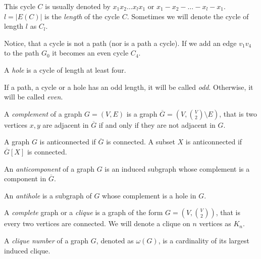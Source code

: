 This cycle $C$ is usually denoted by $x_1x_2\ldots x_lx_1$ or $x_1 - x_2 - \ldots - x_l - x_1$. $l = |E(C)|$ is the \emph{length} of the cycle $C$. Sometimes we will denote the cycle of length $l$ as $C_l$.

Notice, that a cycle is not a path (nor is a path a cycle). If we add an edge $v_1v_4$ to the path $G_0$ it becomes an even cycle $C_4$.

\begin{defn}[hole]
  A \emph{hole} is a cycle of length at least four.
\end{defn}

If a path, a cycle or a hole has an odd length, it will be called \emph{odd}. Otherwise, it will be called \emph{even}.

\begin{defn}[complement]
  A \emph{complement} of a graph $G = (V, E)$ is a graph $\overline{G} = (V, {V \choose 2} \setminus E)$, that is two vertices $x, y$ are adjacent in $\overline{G}$ if and only if they are not adjacent in $G$.
\end{defn}


\begin{defn}
  A graph $G$ is anticonnected if $\overline{G}$ is connected.
  A subset $X$ is anticonnected if $\overline{G}[X]$ is connected.
\end{defn}

\begin{defn}[anticomponent]
  An \emph{anticomponent} of a graph $G$ is an induced subgraph whose complement is a component in $\overline{G}$.
\end{defn}

\begin{defn}[antihole]
  An \emph{antihole} is a subgraph of $G$ whose complement is a hole in $G$.
\end{defn}

\begin{defn}[clique]
  A \emph{complete} graph or a \emph{clique} is a graph of the form $G = (V, {V \choose 2})$, that is every two vertices are connected. We will denote a clique on $n$ vertices as $K_n$.
\end{defn}

\begin{defn}
  A \emph{clique number} of a graph $G$, denoted as $\omega(G)$, is a cardinality of its largest induced clique.
\end{defn}

